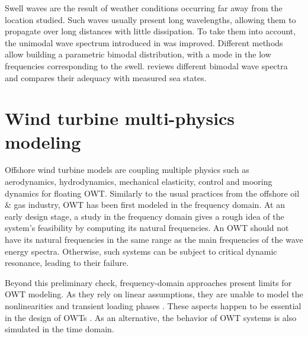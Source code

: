 Swell waves are the result of weather conditions occurring far away from the location studied. 
Such waves usually present long wavelengths, allowing them to propagate over long distances with little dissipation. 
To take them into account, the unimodal wave spectrum introduced in  was improved. 
Different methods allow building a parametric bimodal distribution, with a mode in the low frequencies corresponding to the swell. 
\citet{guedes_2005_bimodal_jonswap} reviews different bimodal wave spectra and compares their adequacy with measured sea states. 



\section{Wind turbine multi-physics modeling} \label{sec:owt_modeling}

Offshore wind turbine models are coupling multiple physics such as aerodynamics, hydrodynamics, mechanical elasticity, control and mooring dynamics for floating OWT. 
Similarly to the usual practices from the offshore oil \& gas industry, OWT has been first modeled in the frequency domain. 
At an early design stage, a study in the frequency domain gives a rough idea of the system's feasibility by computing its natural frequencies. 
An OWT should not have its natural frequencies in the same range as the main frequencies of the wave energy spectra. 
Otherwise, such systems can be subject to critical dynamic resonance, leading to their failure.

Beyond this preliminary check, frequency-domain approaches present limits for OWT modeling. 
As they rely on linear assumptions, they are unable to model the nonlinearities and transient loading phases \citep{matha_2011_ISOPE}. 
These aspects happen to be essential in the design of OWTs \citep{jonkman_2011_ISOPE}. 
As an alternative, the behavior of OWT systems is also simulated in the time domain. 

